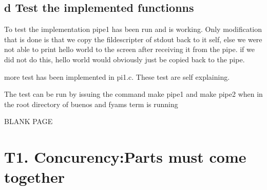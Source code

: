 \documentclass[a4paper,12pt,danish]{report}
\begin{document}
\subsection{d Test the implemented functionns}
	To test the implementation pipe1 has been run and is working. Only modification
	that is done is that we copy the fildescripter of stdout back to it self, else
	we were not able to print hello world to the screen after receiving it from the
	pipe. if we did not do this, hello world would obviously just be copied back to
	the pipe.
	
	more test has been implemented in pi1.c. These test are self explaining.
	 
	The test can be run by issuing the command make pipe1 and make pipe2  when in
	the root directory of buenos and fyams term is running
\newpage

{BLANK PAGE}

\newpage
\section{T1. Concurency:Parts must come together}
\end{document}
